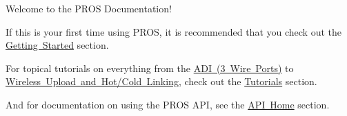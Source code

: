 Welcome to the P\+R\+OS Documentation!

If this is your first time using P\+R\+OS, it is recommended that you check out the \mbox{\hyperlink{getting-started}{Getting Started}} section.

For topical tutorials on everything from the \mbox{\hyperlink{adi_8md}{A\+DI (3 Wire Ports)}} to \mbox{\hyperlink{wireless-upload_8md}{Wireless Upload and Hot/\+Cold Linking}}, check out the \mbox{\hyperlink{tutorials}{Tutorials}} section.

And for documentation on using the P\+R\+OS A\+PI, see the \mbox{\hyperlink{api}{A\+PI Home}} section. 